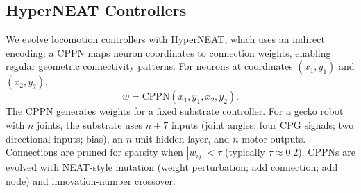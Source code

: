 \documentclass[dvipsnames,format=sigconf,anonymous=false,review=false]{acmart}
\begin{document}
\subsection{HyperNEAT Controllers}
\label{sec:hyperneat}
We evolve locomotion controllers with HyperNEAT, which uses an indirect encoding: a CPPN maps neuron coordinates to connection weights, enabling regular geometric connectivity patterns. For neurons at coordinates $(x_1,y_1)$ and $(x_2,y_2)$,
\begin{equation}
w = \mathrm{CPPN}(x_1,y_1,x_2,y_2).
\end{equation}
The CPPN generates weights for a fixed substrate controller. For a gecko robot with $n$ joints, the substrate uses $n+7$ inputs (joint angles; four CPG signals; two directional inputs; bias), an $n$-unit hidden layer, and $n$ motor outputs. Connections are pruned for sparsity when $|w_{ij}|<\tau$ (typically $\tau \approx 0.2$). CPPNs are evolved with NEAT-style mutation (weight perturbation; add connection; add node) and innovation-number crossover.
\end{document}

